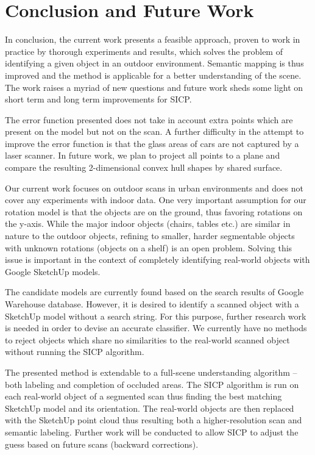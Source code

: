 \documentclass{llncs}
\begin{document}
\section{Conclusion and Future Work}

In conclusion, the current work presents a feasible approach, proven
to work in practice by thorough experiments and results, which solves
the problem of identifying a given object in an outdoor
environment. Semantic mapping is thus improved and the method is
applicable for a better understanding of the scene. The work raises a
myriad of new questions and future work sheds some light on short term
and long term improvements for SICP.

The error function presented does not take in account extra points
which are present on the model but not on the scan. A further
difficulty in the attempt to improve the error function is that the
glass areas of cars are not captured by a laser scanner. In future
work, we plan to project all points to a plane and compare the
resulting 2-dimensional convex hull shapes by shared surface.

Our current work focuses on outdoor scans in urban environments and
does not cover any experiments with indoor data. One very important
assumption for our rotation model is that the objects are on the
ground, thus favoring rotations on the y-axis. While the major indoor
objects (chairs, tables etc.) are similar in nature to the outdoor
objects, refining to smaller, harder segmentable objects with unknown
rotations (objects on a shelf) is an open problem. Solving this issue
is important in the context of completely identifying real-world
objects with Google SketchUp models.

The candidate models are currently found based on the search results
of Google Warehouse database. However, it is desired to identify a
scanned object with a SketchUp model without a search string. For this
purpose, further research work is needed in order to devise an
accurate classifier. We currently have no methods to reject objects
which share no similarities to the real-world scanned object without
running the SICP algorithm.

The presented method is extendable to a full-scene understanding
algorithm -- both labeling and completion of occluded areas. The SICP
algorithm is run on each real-world object of a segmented scan thus
finding the best matching SketchUp model and its orientation. The
real-world objects are then replaced with the SketchUp point cloud
thus resulting both a higher-resolution scan and semantic
labeling. Further work will be conducted to allow SICP to adjust
the guess based on future scans (backward corrections).




\end{document}
